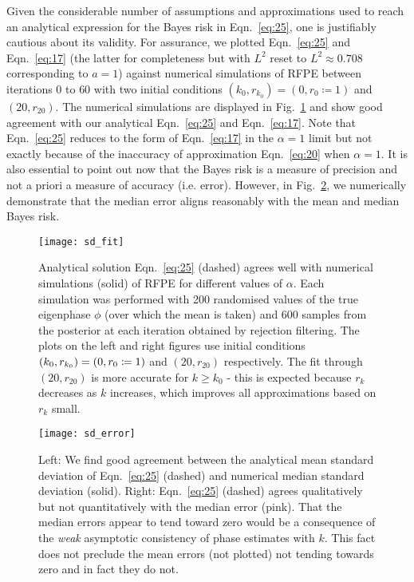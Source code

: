 \documentclass[twocolumn,
 reprint,
 amsmath,amssymb,
 aps,
 floatfix,
superscriptaddress
]{revtex4-1}
\begin{document}
Given the considerable number of assumptions and approximations used to
reach an analytical expression for the Bayes risk in Eqn.~\ref{eq:25}, one
is justifiably cautious about its validity. For assurance, we plotted
Eqn.~\ref{eq:25} and Eqn.~\ref{eq:17} (the latter for completeness but with
$L^{2}$ reset to $L^{2}\approx0.708$ corresponding to $a=1$)
against numerical simulations of RFPE between iterations $0$ to $60$
with two initial conditions $(k_{0},r_{k_{0}})=(0,r_{0}\coloneqq1)$
and $(20,r_{20})$. The numerical simulations are displayed in Fig.~\ref{Analytical numerical fit} and show good agreement with our analytical Eqn.~\ref{eq:25}
and Eqn.~\ref{eq:17}. Note that Eqn.~\ref{eq:25} reduces to the form
of Eqn.~\ref{eq:17} in the $\alpha=1$ limit but not exactly because of
the inaccuracy of approximation Eqn.~\ref{eq:20} when $\alpha=1$. It is also essential to point out now that the Bayes risk is a measure of precision and not a priori a measure of accuracy (i.e. error). However, in Fig.~\ref{Std vs error}, we numerically demonstrate that the median error aligns reasonably with the mean and median Bayes risk. 

\begin{figure}
\texttt{[image: sd\_fit]}
\centering{}\caption{{\scriptsize{}Analytical solution Eqn.~\ref{eq:25} (dashed) agrees well with numerical simulations (solid) of
RFPE for different values of $\alpha$. Each simulation was performed
with 200 randomised values of the true eigenphase $\phi$ (over which
the mean is taken) and 600 samples from the posterior at each iteration
obtained by rejection filtering. The plots on the left and right figures
use initial conditions $(k_{0},r_{k_{0}})=(0,r_{0}\protect\coloneqq1)$
and $(20,r_{20})$ respectively. The fit through $(20,r_{20})$ is
more accurate for $k\geq k_{0}$ - this is expected because $r_{k}$
decreases as $k$ increases, which improves all approximations based
on $r_{k}$ small.}}
\label{Analytical numerical fit} 
\end{figure}

\begin{figure}
\texttt{[image: sd\_error]}
\centering{}
\caption{{\scriptsize{} Left: We find good agreement between the analytical mean standard
deviation of Eqn.~\ref{eq:25} (dashed) and numerical median standard deviation (solid). Right: Eqn.~\ref{eq:25} (dashed) agrees
qualitatively but not quantitatively with the median error (pink). That the median errors appear to tend toward zero would
be a consequence of the \textit{weak} asymptotic consistency of phase estimates with $k$.
This fact does not preclude the mean errors (not plotted) not tending
towards zero and in fact they do not.}}
\label{Std vs error}
\end{figure}
\end{document}
